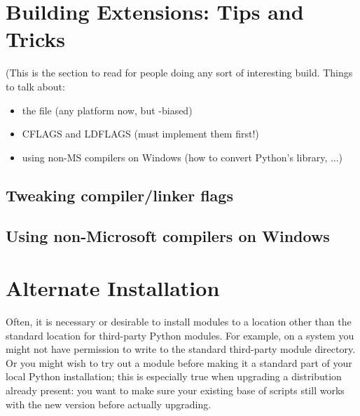 \documentclass{howto}
\begin{document}
\newcommand{\installscheme}[8]
  {\begin{tableiii}{lll}{textrm}
          {Type of file}
          {Installation Directory}
          {Override option}
     \lineiii{pure module distribution}
             {\filevar{#1}\filenq{#2}}
             {\longprogramopt{install-purelib}}
     \lineiii{non-pure module distribution}
             {\filevar{#3}\filenq{#4}}
             {\longprogramopt{install-platlib}}
     \lineiii{scripts}
             {\filevar{#5}\filenq{#6}}
             {\longprogramopt{install-scripts}}
     \lineiii{data}
             {\filevar{#7}\filenq{#8}}
             {\longprogramopt{install-data}}
   \end{tableiii}}


\section{Building Extensions: Tips and Tricks}
\label{building-ext}

(This is the section to read for people doing any sort of interesting
build.  Things to talk about:
\begin{itemize}
\item the  file (any platform now, but \UNIX-biased)
\item CFLAGS and LDFLAGS (must implement them first!)
\item using non-MS compilers on Windows (how to convert
  Python's library, ...)  
\end{itemize}


\subsection{Tweaking compiler/linker flags}
\label{tweak-flags}


\subsection{Using non-Microsoft compilers on Windows}
\label{non-ms-compilers}




\section{Alternate Installation}
\label{alt-install}

Often, it is necessary or desirable to install modules to a location
other than the standard location for third-party Python modules.  For
example, on a \UNIX{} system you might not have permission to write to the
standard third-party module directory.  Or you might wish to try out a
module before making it a standard part of your local Python
installation; this is especially true when upgrading a distribution
already present: you want to make sure your existing base of scripts
still works with the new version before actually upgrading.
\end{document}
